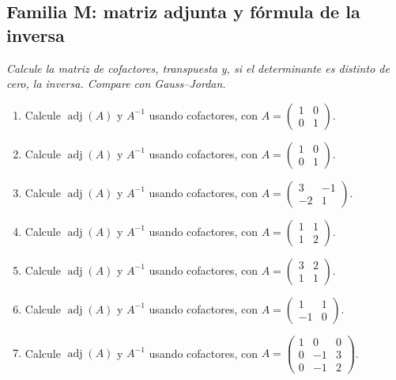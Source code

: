 \documentclass[12pt]{article}
\theoremstyle{remark}
\newcommand{\adj}{\operatorname{adj}}
\newcounter{contadorEjercicio}
\newenvironment{listaejercicios}{\begin{enumerate}[label=\textbf{E\arabic*.},leftmargin=2.4em,itemsep=0.52em]\setcounter{enumi}{\value{contadorEjercicio}}}{\setcounter{contadorEjercicio}{\value{enumi}}\end{enumerate}}
\begin{document}
\subsection{Familia M: matriz adjunta y fórmula de la inversa}\noindent\textit{Calcule la matriz de cofactores, transpuesta y, si el determinante es distinto de cero, la inversa. Compare con Gauss--Jordan.}\par\medskip
\begin{listaejercicios}

\item Calcule $\adj(A)$ y $A^{-1}$ usando cofactores, con $A=\begin{pmatrix}1&0\\0&1\end{pmatrix}$.

\item Calcule $\adj(A)$ y $A^{-1}$ usando cofactores, con $A=\begin{pmatrix}1&0\\0&1\end{pmatrix}$.

\item Calcule $\adj(A)$ y $A^{-1}$ usando cofactores, con $A=\begin{pmatrix}3&-1\\-2&1\end{pmatrix}$.

\item Calcule $\adj(A)$ y $A^{-1}$ usando cofactores, con $A=\begin{pmatrix}1&1\\1&2\end{pmatrix}$.

\item Calcule $\adj(A)$ y $A^{-1}$ usando cofactores, con $A=\begin{pmatrix}3&2\\1&1\end{pmatrix}$.

\item Calcule $\adj(A)$ y $A^{-1}$ usando cofactores, con $A=\begin{pmatrix}1&1\\-1&0\end{pmatrix}$.

\item Calcule $\adj(A)$ y $A^{-1}$ usando cofactores, con $A=\begin{pmatrix}1&0&0\\0&-1&3\\0&-1&2\end{pmatrix}$.


\end{listaejercicios}
\end{document}
